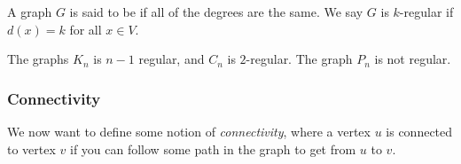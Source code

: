 
\begin{definition}[Regularity]
	A graph $G$ is said to be  if all of the degrees are the same. We say $G$ is $k$-regular if $d(x) = k$ for all $x \in V$.
\end{definition}

\begin{example}
	The graphs $K_n$ is $n - 1$ regular, and $C_n$ is $2$-regular.
	The graph $P_n$ is not regular.
\end{example}

\subsubsection{Connectivity}

We now want to define some notion of \emph{connectivity}, where a vertex $u$ is connected to vertex $v$ if you can follow some path in the graph to get from $u$ to $v$.

